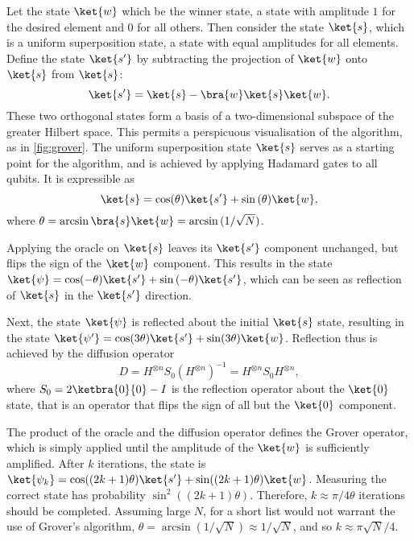 Let the state $\ket{w}$ which be the winner state, a state with amplitude $1$ for the desired element and $0$ for all others.
Then consider the state $\ket{s}$, which is a uniform superposition state, a state with equal amplitudes for all elements.
Define the state $\ket{s'}$ by subtracting the projection of $\ket{w}$ onto $\ket{s}$ from $\ket{s}$:
\begin{equation}
    \label{eq:grover_s'}
    \ket{s'} = \ket{s} - \bra{w}\ket{s}\ket{w}.
\end{equation}
These two orthogonal states form a basis of a two-dimensional subspace of the greater Hilbert space.
This permits a perspicuous visualisation of the algorithm, as in \cref{fig:grover}.
The uniform superposition state $\ket{s}$ serves as a starting point for the algorithm, and is achieved by applying Hadamard gates to all qubits.
It is expressible as
\begin{equation}
    \ket{s} = \cos(\theta)\ket{s'} + \sin{(\theta)}\ket{w},
\end{equation}
where $\theta=\arcsin\bra{s}\ket{w}=\arcsin{}(1/\sqrt{N})$.

Applying the oracle on $\ket{s}$ leaves its $\ket{s'}$ component unchanged, but flips the sign of the $\ket{w}$ component.
This results in the state $\ket{\psi} = \cos(-\theta)\ket{s'} + \sin{(-\theta)}\ket{s'}$, which can be seen as reflection of $\ket{s}$ in the $\ket{s'}$ direction.


Next, the state $\ket{\psi}$ is reflected about the initial $\ket{s}$ state, resulting in the state $\ket{\psi'} = \cos(3\theta)\ket{s'} + \sin(3\theta)\ket{w}$.
Reflection thus is achieved by the diffusion operator
\begin{equation}
    D=H^{\otimes n} S_0 (H^{\otimes n})^{-1} = H^{\otimes n} S_0 H^{\otimes n},
\end{equation}
where $S_0= 2\ketbra{0}{0} - I$ is the reflection operator about the $\ket{0}$ state, that is an operator that flips the sign of all but the $\ket{0}$ component.

The product of the oracle and the diffusion operator defines the Grover operator, which is simply applied until the amplitude of the  $\ket{w}$ is sufficiently amplified.
After $k$ iterations, the state is $\ket{\psi_k} = \cos((2k+1)\theta)\ket{s'} + \sin((2k+1)\theta)\ket{w}$.
Measuring the correct state has probability $\sin^2((2k+1)\theta)$.
Therefore, $k \approx {\pi}/{4\theta}$ iterations should be completed.
Assuming large $N$, for a short list would not warrant the use of Grover's algorithm, $\theta = \arcsin{({1}/{\sqrt{N}})} \approx 1/\sqrt{N}$, and so $k \approx \pi\sqrt{N}/4$.


